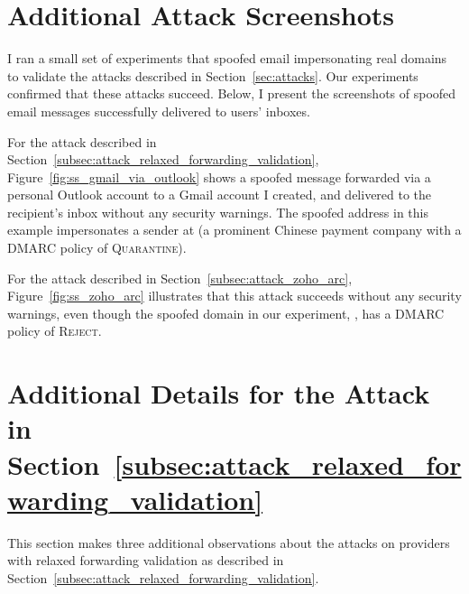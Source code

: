 

\section{Additional Attack Screenshots}
I ran a small set of experiments that spoofed email impersonating real domains to validate the attacks described in Section~\ref{sec:attacks}.
Our experiments confirmed that these attacks succeed.
Below, I present the screenshots of spoofed email messages successfully delivered to users' inboxes.

For the attack described in Section~\ref{subsec:attack_relaxed_forwarding_validation}, Figure~\ref{fig:ss_gmail_via_outlook} shows a spoofed message forwarded via a personal Outlook account to a Gmail account I created, and delivered to the recipient's inbox without any security warnings.
The spoofed address in this example impersonates a sender at  (a prominent Chinese payment company with a DMARC policy of \textsc{Quarantine}).

For the attack described in Section~\ref{subsec:attack_zoho_arc}, Figure~\ref{fig:ss_zoho_arc} illustrates that this attack succeeds
without any security warnings, even though the spoofed domain in our
experiment, , has a DMARC policy of \textsc{Reject}.


\section{Additional Details for the Attack in Section~\ref{subsec:attack_relaxed_forwarding_validation}}
\label{sec:append_change_behavior_details}
This section makes three additional observations about the attacks on
providers with relaxed forwarding validation as described in
Section~\ref{subsec:attack_relaxed_forwarding_validation}.

